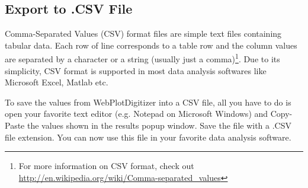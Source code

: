 \documentclass[letterpaper, 10pt]{article}
\begin{document}
\subsection{Export to .CSV File}
Comma-Separated Values (CSV) format files are simple text files containing tabular data. Each row of line corresponds to a table row and the column values are separated by a character or a string (usually just a comma)\footnote{For more information on CSV format, check out \url{http://en.wikipedia.org/wiki/Comma-separated_values}}. Due to its simplicity, CSV format is supported in most data analysis softwares like Microsoft Excel, Matlab etc.

To save the values from WebPlotDigitizer into a CSV file, all you have to do is open your favorite text editor (e.g. Notepad on Microsoft Windows) and Copy-Paste the values shown in the results popup window. Save the file with a .CSV file extension. You can now use this file in your favorite data analysis software.
\end{document}
